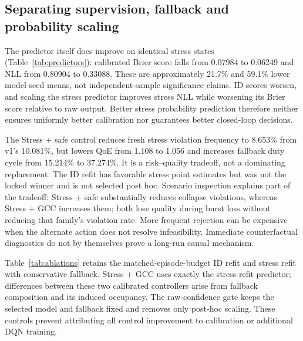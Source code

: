 \documentclass[10pt]{article}
\begin{document}
\subsection{Separating supervision, fallback and probability scaling}
The predictor itself does improve on identical stress states (Table~\ref{tab:predictors}): calibrated Brier score falls from 0.07984 to 0.06249 and NLL from 0.80904 to 0.33088. These are approximately 21.7\% and 59.1\% lower model-seed means, not independent-sample significance claims. ID scores worsen, and scaling the stress predictor improves stress NLL while worsening its Brier score relative to raw output. Better stress probability prediction therefore neither ensures uniformly better calibration nor guarantees better closed-loop decisions.

The Stress + safe control reduces fresh stress violation frequency to 8.653\% from v1's 10.081\%, but lowers QoE from 1.108 to 1.056 and increases fallback duty cycle from 15.214\% to 37.274\%. It is a risk--quality tradeoff, not a dominating replacement. The ID refit has favorable stress point estimates but was not the locked winner and is not selected post hoc. Scenario inspection explains part of the tradeoff: Stress + safe substantially reduces collapse violations, whereas Stress + GCC increases them; both lose quality during burst loss without reducing that family's violation rate. More frequent rejection can be expensive when the alternate action does not resolve infeasibility. Immediate counterfactual diagnostics do not by themselves prove a long-run causal mechanism.

Table~\ref{tab:ablations} retains the matched-episode-budget ID refit and stress refit with conservative fallback. Stress + GCC uses exactly the stress-refit predictor; differences between these two calibrated controllers arise from fallback composition and its induced occupancy. The raw-confidence gate keeps the selected model and fallback fixed and removes only post-hoc scaling. These controls prevent attributing all control improvement to calibration or additional DQN training.
\end{document}
